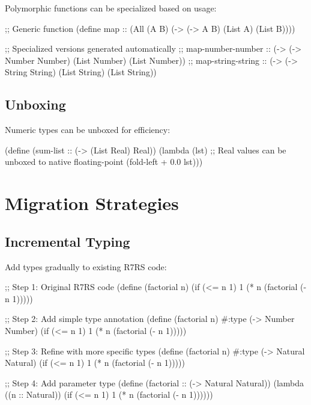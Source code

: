 Polymorphic functions can be specialized based on usage:

\begin{example}[Specialization]
\begin{lambdustcode}
;; Generic function
(define map :: (All (A B) (-> (-> A B) (List A) (List B))))

;; Specialized versions generated automatically
;; map-number-number :: (-> (-> Number Number) (List Number) (List Number))
;; map-string-string :: (-> (-> String String) (List String) (List String))
\end{lambdustcode}
\end{example}

\subsection{Unboxing}
\label{subsec:unboxing}

Numeric types can be unboxed for efficiency:

\begin{example}[Unboxing]
\begin{lambdustcode}
(define (sum-list :: (-> (List Real) Real))
  (lambda (lst)
    ;; Real values can be unboxed to native floating-point
    (fold-left + 0.0 lst)))
\end{lambdustcode}
\end{example}

\section{Migration Strategies}
\label{sec:migration}

\subsection{Incremental Typing}
\label{subsec:incremental}

Add types gradually to existing R7RS code:

\begin{example}
\begin{lambdustcode}
;; Step 1: Original R7RS code
(define (factorial n)
  (if (<= n 1) 1 (* n (factorial (- n 1)))))

;; Step 2: Add simple type annotation  
(define (factorial n)
  #:type (-> Number Number)
  (if (<= n 1) 1 (* n (factorial (- n 1)))))

;; Step 3: Refine with more specific types
(define (factorial n)
  #:type (-> Natural Natural)  
  (if (<= n 1) 1 (* n (factorial (- n 1)))))

;; Step 4: Add parameter type  
(define (factorial :: (-> Natural Natural))
  (lambda ((n :: Natural))
    (if (<= n 1) 1 (* n (factorial (- n 1))))))
\end{lambdustcode}
\end{example}


